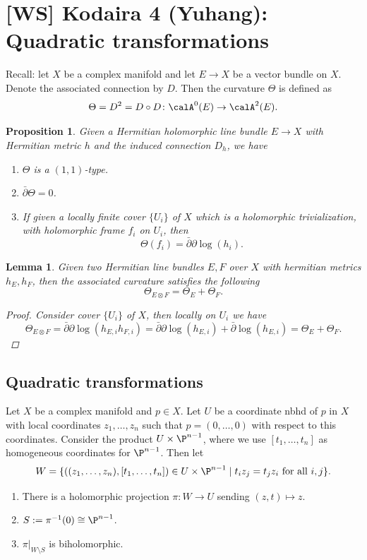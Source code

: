 \documentclass[A4paper, british]{amsart}
\theoremstyle{darkgreentheorem}
\newtheorem{lm}[thm]{Lemma}
\newtheorem{prop}[thm]{Proposition}
\theoremstyle{darkbluedefinition}
\theoremstyle{darkredexample}
\theoremstyle{remark}
\newcommand{\1}{\mathbbm{1}}
\newcommand{\ot}{\otimes}
\newcommand{\tms}{\times}
\begin{document}
\section{[WS] Kodaira 4 (Yuhang): Quadratic transformations}

Recall: let $X$ be a complex manifold and let $E\to X$ be a vector bundle on $X$.
Denote the associated connection by $D$.
Then the curvature $\Theta$ is defined as
\[ \Theta = D^{2} =D\circ D\colon \calA^{0}(E)\to \calA^{2}(E). \]

\begin{prop}
    Given a Hermitian holomorphic line bundle $E\to X$ with Hermitian metric $h$ and the induced connection $D_{h}$, we have
    \begin{enumerate}
	\item $\Theta$ is a $(1,1)$-type.
	\item $\bar{\partial} \Theta =0$.
	\item If given a locally finite cover $\{U_{i}\}$ of $X$ which is a holomorphic trivialization, with holomorphic frame $f_{i}$ on $U_{i}$, then
	    \[ \Theta(f_{i})=\bar{\partial}\partial \log(h_{i}). \]
    \end{enumerate}
\end{prop}

\begin{lm}
    Given two Hermitian line bundles $E,F$ over $X$ with hermitian metrics $h_{E},h_{F}$, then the associated curvature satisfies the following
    \[ \Theta_{E\ot F}=\Theta_{E}+\Theta_{F}. \]
    \begin{proof}
	Consider cover $\{U_{i}\}$ of $X$, then locally on $U_{i}$ we have
	\[ \Theta_{E\ot F}=\bar{\partial}\partial \log(h_{E,i}h_{F,i})=\bar{\partial}\partial \log(h_{E,i})+\bar{\partial}\log(h_{E,i})=\Theta_{E}+\Theta_{F}.\]
    \end{proof}
\end{lm}

\subsection{Quadratic transformations}

Let $X$ be a complex manifold and $p\in X$.
Let $U$ be a coordinate nbhd of $p$ in $X$ with local coordinates $z_{1},\ldots,z_{n}$ such that $p=(0,\ldots,0)$ with respect to this coordinates.
Consider the product $U\tms \P^{n-1}$, where we use $[t_{1},\ldots,t_{n}]$ as homogeneous coordinates for $\P^{n-1}$.
Then let
\[ W=\{ ((z_{1},\ldots,z_{n}),[t_{1},\ldots,t_{n}])\in U\tms \P^{n-1} \mid t_{i}z_{j}=t_{j}z_{i} \text{ for all } i,j\}.\]
\begin{enumerate}
    \item There is a holomorphic projection $\pi\colon W\to U$ sending $(z,t)\mapsto z$.
    \item $S:=\pi^{-1}(0)\cong \P^{n-1}$.
    \item $\pi|_{W\setminus S}$ is biholomorphic.
\end{enumerate}
\end{document}
